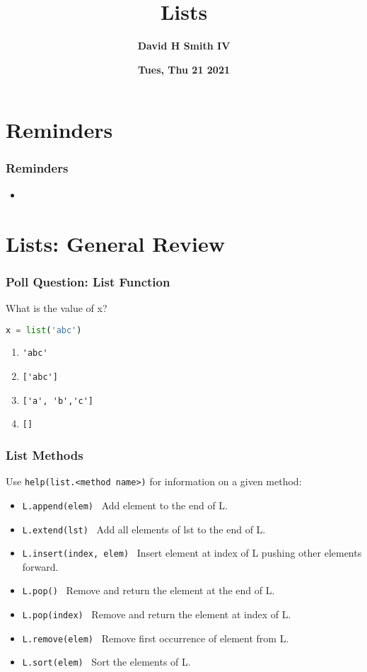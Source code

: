 \documentclass{beamer}
\title{\textbf{Lists}}
\author{\textbf{David H Smith IV}}
\institute[\textbf{UIUC}]{\textbf{University of Illinois Urbana-Champaign}}
\date{\textbf{Tues, Thu 21 2021}}
\begin{document}
\frame{\titlepage}

\section{Reminders}

%
%
\begin{frame}
  \frametitle{Reminders}
  \begin{itemize}
    \item 
  \end{itemize}
\end{frame}

\section{Lists: General Review}

%
%
\begin{frame}[fragile]
  \frametitle{Poll Question: List Function}
  What is the value of x?
  \begin{lstlisting}[language=Python, autogobble]
  x = list('abc')
  \end{lstlisting}
  \vfill
  \begin{enumerate}[A]
    \item \lstinline|'abc'|
    \item \lstinline|['abc']|
    \item \lstinline|['a', 'b','c']|
    \item \lstinline|[]|
  \end{enumerate}
\end{frame}

%
%
\begin{frame}[fragile]
  \frametitle{List Methods}
  Use \lstinline|help(list.<method name>)| for information on a given method:
  \begin{itemize}
    \item \lstinline|L.append(elem)| \textrightarrow \ Add element to the end of L.
    \item \lstinline|L.extend(lst)| \textrightarrow \ Add all elements of lst to the end of L.
    \item \lstinline|L.insert(index, elem)| \textrightarrow \ Insert element at index of L pushing other elements forward.
    \item \lstinline|L.pop()| \textrightarrow \ Remove and return the element at the end of L.
    \item \lstinline|L.pop(index)| \textrightarrow \ Remove and return the element at index of L.
    \item \lstinline|L.remove(elem)| \textrightarrow \ Remove first occurrence of element from L.
    \item \lstinline|L.sort(elem)| \textrightarrow \ Sort the elements of L.
  \end{itemize}
\end{frame}
\end{document}

